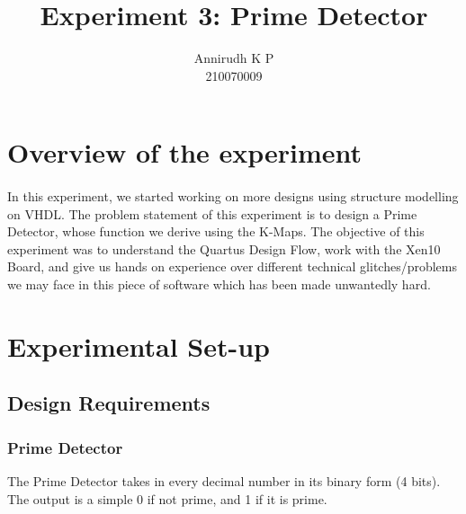 \documentclass[12pt]{article}
\title{Experiment 3: Prime Detector}
\author{Annirudh K P\\%
210070009}
\begin{document}
\maketitle

\section{Overview of the experiment}
\paragraph{}
In this experiment, we started working on more designs using structure modelling on VHDL. The problem statement of this experiment is to design a Prime Detector, whose function we derive using the K-Maps. The objective of this experiment was to understand the Quartus Design Flow, work with the Xen10 Board, and give us hands on experience over different technical glitches/problems we may face in this piece of software which has been made unwantedly hard.

\section{Experimental Set-up}

\subsection{Design Requirements}
\subsubsection{Prime Detector}
The Prime Detector takes in every decimal number in its binary form (4 bits). The output is a simple 0 if not prime, and 1 if it is prime.
\end{document}
